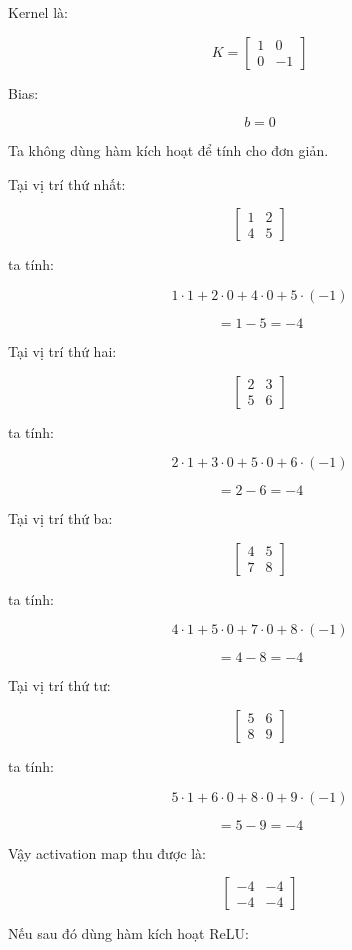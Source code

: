 Kernel là:

\[
K=
\begin{bmatrix}
1 & 0\\
0 & -1
\end{bmatrix}
\]

Bias:

\[
b=0
\]

Ta không dùng hàm kích hoạt để tính cho đơn giản.

Tại vị trí thứ nhất:

\[
\begin{bmatrix}
1 & 2\\
4 & 5
\end{bmatrix}
\]

ta tính:

\[
1\cdot1+2\cdot0+4\cdot0+5\cdot(-1)
\]

\[
=1-5=-4
\]

Tại vị trí thứ hai:

\[
\begin{bmatrix}
2 & 3\\
5 & 6
\end{bmatrix}
\]

ta tính:

\[
2\cdot1+3\cdot0+5\cdot0+6\cdot(-1)
\]

\[
=2-6=-4
\]

Tại vị trí thứ ba:

\[
\begin{bmatrix}
4 & 5\\
7 & 8
\end{bmatrix}
\]

ta tính:

\[
4\cdot1+5\cdot0+7\cdot0+8\cdot(-1)
\]

\[
=4-8=-4
\]

Tại vị trí thứ tư:

\[
\begin{bmatrix}
5 & 6\\
8 & 9
\end{bmatrix}
\]

ta tính:

\[
5\cdot1+6\cdot0+8\cdot0+9\cdot(-1)
\]

\[
=5-9=-4
\]

Vậy activation map thu được là:

\[
\begin{bmatrix}
-4 & -4\\
-4 & -4
\end{bmatrix}
\]

Nếu sau đó dùng hàm kích hoạt ReLU:

